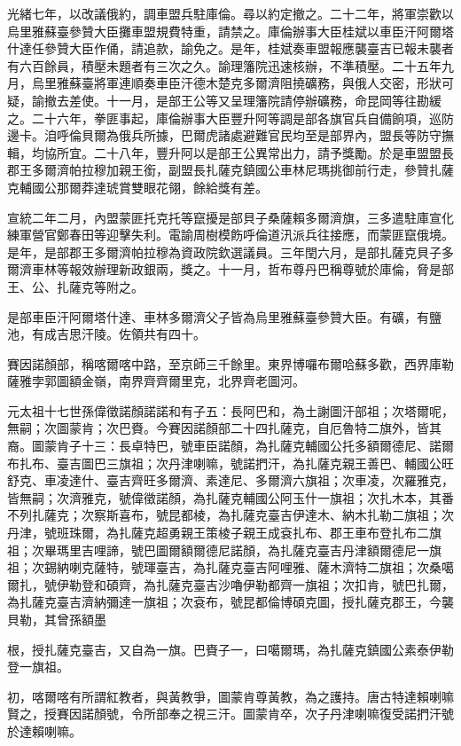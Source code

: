 \begin{pinyinscope}
光緒七年，以改議俄約，調車盟兵駐庫倫。尋以約定撤之。二十二年，將軍崇歡以烏里雅蘇臺參贊大臣攤車盟規費特重，請禁之。庫倫辦事大臣桂斌以車臣汗阿爾塔什達任參贊大臣作俑，請追款，諭免之。是年，桂斌奏車盟報應襲臺吉已報未襲者有六百餘員，積壓未題者有三次之久。諭理籓院迅速核辦，不準積壓。二十五年九月，烏里雅蘇臺將軍連順奏車臣汗德木楚克多爾濟阻撓礦務，與俄人交密，形狀可疑，諭撤去差使。十一月，是部王公等又呈理籓院請停辦礦務，命昆岡等往勘緩之。二十六年，拳匪事起，庫倫辦事大臣豐升阿等調是部各旗官兵自備餉項，巡防邊卡。洎呼倫貝爾為俄兵所據，巴爾虎諸處避難官民均至是部界內，盟長等防守撫輯，均協所宜。二十八年，豐升阿以是部王公異常出力，請予獎勵。於是車盟盟長郡王多爾濟帕拉穆加親王銜，副盟長扎薩克鎮國公車林尼瑪挑御前行走，參贊扎薩克輔國公那爾莽達琥賞雙眼花翎，餘給獎有差。

宣統二年二月，內盟蒙匪托克托等竄擾是部貝子桑薩賴多爾濟旗，三多遣駐庫宣化練軍營官鄭春田等迎擊失利。電諭周樹模飭呼倫道汛派兵往接應，而蒙匪竄俄境。是年，是部郡王多爾濟帕拉穆為資政院欽選議員。三年閏六月，是部扎薩克貝子多爾濟車林等報效辦理新政銀兩，獎之。十一月，哲布尊丹巴稱尊號於庫倫，脅是部王、公、扎薩克等附之。

是部車臣汗阿爾塔什達、車林多爾濟父子皆為烏里雅蘇臺參贊大臣。有礦，有鹽池，有成吉思汗陵。佐領共有四十。

賽因諾顏部，稱喀爾喀中路，至京師三千餘里。東界博囉布爾哈蘇多歡，西界庫勒薩雅孛郭圖額金嶺，南界齊齊爾里克，北界齊老圖河。

元太祖十七世孫偉徵諾顏諾諾和有子五：長阿巴和，為土謝圖汗部祖；次塔爾呢，無嗣；次圖蒙肯；次巴賚。今賽因諾顏部二十四扎薩克，自厄魯特二旗外，皆其裔。圖蒙肯子十三：長卓特巴，號車臣諾顏，為扎薩克輔國公托多額爾德尼、諾爾布扎布、臺吉圖巴三旗祖；次丹津喇嘛，號諾捫汗，為扎薩克親王善巴、輔國公旺舒克、車凌達什、臺吉齊旺多爾濟、素達尼、多爾濟六旗祖；次車凌，次羅雅克，皆無嗣；次濟雅克，號偉徵諾顏，為扎薩克輔國公阿玉什一旗祖；次扎木本，其番不列扎薩克；次察斯喜布，號昆都棱，為扎薩克臺吉伊達木、納木扎勒二旗祖；次丹津，號班珠爾，為扎薩克超勇親王策棱子親王成袞扎布、郡王車布登扎布二旗祖；次畢瑪里吉哩諦，號巴圖爾額爾德尼諾顏，為扎薩克臺吉丹津額爾德尼一旗祖；次錫納喇克薩特，號琿臺吉，為扎薩克臺吉阿哩雅、薩木濟特二旗祖；次桑噶爾扎，號伊勒登和碩齊，為扎薩克臺吉沙嚕伊勒都齊一旗祖；次扣肯，號巴扎爾，為扎薩克臺吉濟納彌達一旗祖；次袞布，號昆都倫博碩克圖，授扎薩克郡王，今襲貝勒，其曾孫額墨

根，授扎薩克臺吉，又自為一旗。巴賚子一，曰噶爾瑪，為扎薩克鎮國公素泰伊勒登一旗祖。

初，喀爾喀有所謂紅教者，與黃教爭，圖蒙肯尊黃教，為之護持。唐古特達賴喇嘛賢之，授賽因諾顏號，令所部奉之視三汗。圖蒙肯卒，次子丹津喇嘛復受諾捫汗號於達賴喇嘛。


\end{pinyinscope}
